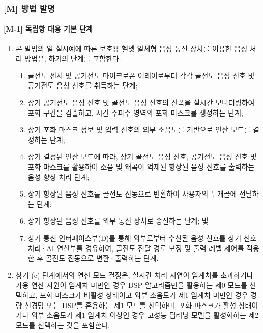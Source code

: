 \documentclass{article}
\begin{document}
\subsubsection{[M] 방법 발명}

\paragraph{[M-1] 독립항 대응 기본 단계}

\begin{enumerate}[label = \textbf{(M.1.\arabic*)}]

    \item 본 발명의 일 실시예에 따른 보호용 헬멧 일체형
    음성 통신 장치를 이용한 음성 처리 방법은, 하기의
    단계를 포함한다.

    \begin{enumerate}[label = \textbf{(\alph*)}]

        \item 골전도 센서 및 공기전도 마이크로폰 어레이로부터 각각 골전도 음성 신호 및 공기전도 음성 신호를 취득하는 단계;

        \item 상기 공기전도 음성 신호 및 골전도 음성 신호의 진폭을 실시간 모니터링하여 포화 구간을 검출하고, 시간-주파수 영역의 포화 마스크를 생성하는 단계;

        \item 상기 포화 마스크 정보 및 입력 신호의 외부 소음도를 기반으로 연산 모드를 결정하는 단계;

        \item 상기 결정된 연산 모드에 따라, 상기 골전도 음성 신호, 공기전도 음성 신호 및 포화 마스크를 활용하여 소음 및 왜곡이 억제된 향상된 음성 신호를 출력하는 음성 향상 처리 단계;

        \item 상기 향상된 음성 신호를 골전도 진동으로 변환하여 사용자의 두개골에 전달하는 단계;

        \item 상기 향상된 음성 신호를 외부 통신 장치로 송신하는 단계; 및

        \item 상기 통신 인터페이스부(D)를 통해 외부로부터 수신된 음성 신호를 상기 신호처리·AI 연산부를 경유하여, 골전도 전달 경로 보정 및 출력 레벨 제어를 적용한 후 골전도 진동으로 변환·출력하는 단계.

    \end{enumerate}

    \item 상기 (c) 단계에서의 연산 모드 결정은, 실시간 처리 지연이 임계치를 초과하거나 가용 연산 자원이 임계치 미만인 경우 DSP 알고리즘만을 활용하는 제0 모드를 선택하고, 포화 마스크가 비활성 상태이고 외부 소음도가 제1 임계치 미만인 경우 경량 신경망 또는 DSP를 혼용하는 제1 모드를 선택하며, 포화 마스크가 활성 상태이거나 외부 소음도가 제1 임계치 이상인 경우 고성능 딥러닝 모델을 활성화하는 제2 모드를 선택하는 것을 포함한다.



\end{enumerate}
\end{document}

